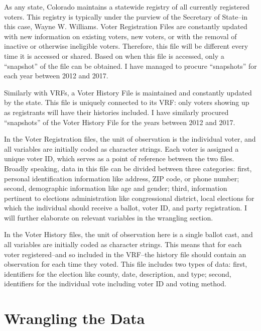 \documentclass[12pt,twoside]{reedthesis}
\begin{document}
  As any state, Colorado maintains a statewide registry of all currently
  registered voters. This registry is typically under the purview of the
  Secretary of State--in this case, Wayne W. Williams. Voter Registration
  Files are constantly updated with new information on existing voters,
  new voters, or with the removal of inactive or otherwise ineligible
  voters. Therefore, this file will be different every time it is accessed
  or shared. Based on when this file is accessed, only a ``snapshot'' of
  the file can be obtained. I have managed to procure ``snapshots'' for
  each year between 2012 and 2017.
  
  Similarly with VRFs, a Voter History File is maintained and constantly
  updated by the state. This file is uniquely connected to its VRF: only
  voters showing up as registrants will have their histories included. I
  have similarly procured ``snapshots'' of the Voter History File for the
  years between 2012 and 2017.
  
  In the Voter Registration files, the unit of observation is the
  individual voter, and all variables are initially coded as character
  strings. Each voter is assigned a unique voter ID, which serves as a
  point of reference between the two files. Broadly speaking, data in this
  file can be divided between three categories: first, personal
  identification information like address, ZIP code, or phone number;
  second, demographic information like age and gender; third, information
  pertinent to elections administration like congressional district, local
  elections for which the individual should receive a ballot, voter ID,
  and party registration. I will further elaborate on relevant variables
  in the wrangling section.
  
  In the Voter History files, the unit of observation here is a single
  ballot cast, and all variables are initially coded as character strings.
  This means that for each voter registered--and so included in the
  VRF--the history file should contain an observation for each time they
  voted. This file includes two types of data: first, identifiers for the
  election like county, date, description, and type; second, identifiers
  for the individual vote including voter ID and voting method.
  
  \section{Wrangling the Data}\label{wrangling-the-data}
  
\end{document}

